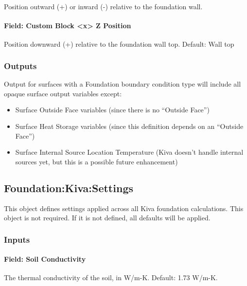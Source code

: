 Position outward (+) or inward (-) relative to the foundation wall.

\paragraph{Field: Custom Block \textless{}x\textgreater{} Z
Position}

Position downward (+) relative to the foundation wall top. Default: Wall
top

\subsubsection{Outputs}

Output for surfaces with a Foundation boundary condition type will
include all opaque surface output variables except:

\begin{itemize}
\tightlist
\item
  Surface Outside Face variables (since there is no ``Outside Face'')
\item
  Surface Heat Storage variables (since this definition depends on an
  ``Outside Face'')
\item
  Surface Internal Source Location Temperature (Kiva doesn't handle
  internal sources yet, but this is a possible future enhancement)
\end{itemize}

\subsection{Foundation:Kiva:Settings}\label{foundation-kiva-settings}

This object defines settings applied across all Kiva foundation
calculations. This object is not required. If it is not defined, all
defaults will be applied.

\subsubsection{Inputs}\label{foundation-kiva-settings-inputs}

\paragraph{Field: Soil Conductivity}\label{foundation-kiva-settings-soil-conductivity}

The thermal conductivity of the soil, in W/m-K. Default: 1.73 W/m-K.

